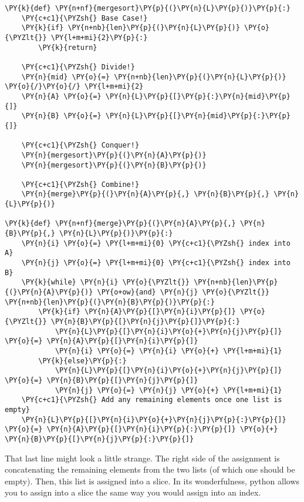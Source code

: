 \begin{Verbatim}[commandchars=\\\{\}]
\PY{k}{def} \PY{n+nf}{mergesort}\PY{p}{(}\PY{n}{L}\PY{p}{)}\PY{p}{:}
    \PY{c+c1}{\PYZsh{} Base Case!}
    \PY{k}{if} \PY{n+nb}{len}\PY{p}{(}\PY{n}{L}\PY{p}{)} \PY{o}{\PYZlt{}} \PY{l+m+mi}{2}\PY{p}{:}
        \PY{k}{return}

    \PY{c+c1}{\PYZsh{} Divide!}
    \PY{n}{mid} \PY{o}{=} \PY{n+nb}{len}\PY{p}{(}\PY{n}{L}\PY{p}{)} \PY{o}{/}\PY{o}{/} \PY{l+m+mi}{2}
    \PY{n}{A} \PY{o}{=} \PY{n}{L}\PY{p}{[}\PY{p}{:}\PY{n}{mid}\PY{p}{]}
    \PY{n}{B} \PY{o}{=} \PY{n}{L}\PY{p}{[}\PY{n}{mid}\PY{p}{:}\PY{p}{]}

    \PY{c+c1}{\PYZsh{} Conquer!}
    \PY{n}{mergesort}\PY{p}{(}\PY{n}{A}\PY{p}{)}
    \PY{n}{mergesort}\PY{p}{(}\PY{n}{B}\PY{p}{)}

    \PY{c+c1}{\PYZsh{} Combine!}
    \PY{n}{merge}\PY{p}{(}\PY{n}{A}\PY{p}{,} \PY{n}{B}\PY{p}{,} \PY{n}{L}\PY{p}{)}

\PY{k}{def} \PY{n+nf}{merge}\PY{p}{(}\PY{n}{A}\PY{p}{,} \PY{n}{B}\PY{p}{,} \PY{n}{L}\PY{p}{)}\PY{p}{:}
    \PY{n}{i} \PY{o}{=} \PY{l+m+mi}{0} \PY{c+c1}{\PYZsh{} index into A}
    \PY{n}{j} \PY{o}{=} \PY{l+m+mi}{0} \PY{c+c1}{\PYZsh{} index into B}
    \PY{k}{while} \PY{n}{i} \PY{o}{\PYZlt{}} \PY{n+nb}{len}\PY{p}{(}\PY{n}{A}\PY{p}{)} \PY{o+ow}{and} \PY{n}{j} \PY{o}{\PYZlt{}} \PY{n+nb}{len}\PY{p}{(}\PY{n}{B}\PY{p}{)}\PY{p}{:}
        \PY{k}{if} \PY{n}{A}\PY{p}{[}\PY{n}{i}\PY{p}{]} \PY{o}{\PYZlt{}} \PY{n}{B}\PY{p}{[}\PY{n}{j}\PY{p}{]}\PY{p}{:}
            \PY{n}{L}\PY{p}{[}\PY{n}{i}\PY{o}{+}\PY{n}{j}\PY{p}{]} \PY{o}{=} \PY{n}{A}\PY{p}{[}\PY{n}{i}\PY{p}{]}
            \PY{n}{i} \PY{o}{=} \PY{n}{i} \PY{o}{+} \PY{l+m+mi}{1}
        \PY{k}{else}\PY{p}{:}
            \PY{n}{L}\PY{p}{[}\PY{n}{i}\PY{o}{+}\PY{n}{j}\PY{p}{]} \PY{o}{=} \PY{n}{B}\PY{p}{[}\PY{n}{j}\PY{p}{]}
            \PY{n}{j} \PY{o}{=} \PY{n}{j} \PY{o}{+} \PY{l+m+mi}{1}
    \PY{c+c1}{\PYZsh{} Add any remaining elements once one list is empty}
    \PY{n}{L}\PY{p}{[}\PY{n}{i}\PY{o}{+}\PY{n}{j}\PY{p}{:}\PY{p}{]} \PY{o}{=} \PY{n}{A}\PY{p}{[}\PY{n}{i}\PY{p}{:}\PY{p}{]} \PY{o}{+} \PY{n}{B}\PY{p}{[}\PY{n}{j}\PY{p}{:}\PY{p}{]}
\end{Verbatim}



That last line might look a little strange.
The right side of the assignment is concatenating the remaining elements from the two lists (of which one should be empty).
Then, this list is assigned into a slice.
In its wonderfulness, python allows you to assign into a slice the same way you would assign into an index.


